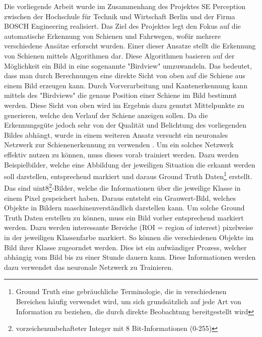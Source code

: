 \documentclass[11pt]{scrartcl}
\begin{document}
\noindent
Die vorliegende Arbeit wurde im Zusammenhang des Projektes SE Perception zwischen der Hochschule für Technik und Wirtschaft Berlin und der Firma BOSCH Engineering realisiert. Das Ziel des Projektes legt den Fokus auf die automatische Erkennung von Schienen und Fahrwegen, wofür mehrere verschiedene Ansätze erforscht wurden. Einer dieser Ansatze stellt die Erkennung von Schienen mittels Algorithmen dar. Diese Algorithmen basieren auf der Möglichkeit ein Bild in eine sogenannte "Birdview" umzuwandeln. Das bedeutet, dass man durch Berechnungen eine direkte Sicht von oben auf die Schiene aus einem Bild erzeugen kann. Durch Vorverarbeitung und Kantenerkennung kann mittels des "Birdviews" die genaue Position einer Schiene im Bild bestimmt werden. Diese Sicht von oben wird im Ergebnis dazu genutzt Mittelpunkte zu generieren, welche den Verlauf der Schiene anzeigen sollen. Da die Erkennungsgüte jedoch sehr von der Qualität und Belichtung des vorliegenden Bildes abhängt, wurde in einem weiteren Ansatz versucht ein neuronales Netzwerk zur Schienenerkennung zu verwenden . Um ein solches Netzwerk effektiv nutzen zu können, muss dieses vorab trainiert werden. Dazu werden Beispielbilder, welche eine Abbildung der jeweiligen Situation die erkannt werden soll darstellen, entsprechend markiert und daraus Ground Truth Daten\footnote{Ground Truth eine gebräuchliche Terminologie, die in verschiedenen Bereichen häufig verwendet wird, um sich grundsätzlich auf jede Art von Information zu beziehen, die durch direkte Beobachtung bereitgestellt wird} erstellt. Das sind uint8\footnote{vorzeichenunbehafteter Integer mit 8 Bit-Informationen (0-255)}-Bilder, welche die Informationen über die jeweilige Klasse in einem Pixel gespeichert haben. Daraus entsteht ein Grauwert-Bild, welches Objekte in Bildern maschinenverständlich darstellen kann. Um solche Ground Truth Daten erstellen zu können, muss ein Bild vorher entsprechend markiert werden.  Dazu werden interessante Bereiche (ROI = region of interest) pixelweise in der jeweiligen Klassenfarbe markiert. So können die verschiedenen Objekte im Bild ihrer Klasse zugeorndet werden. Dies ist ein aufwändiger Prozess, welcher abhängig vom Bild bis zu einer Stunde dauern kann. Diese Informationen werden dazu verwendet das neuronale Netzwerk zu Trainieren. 
\end{document}
